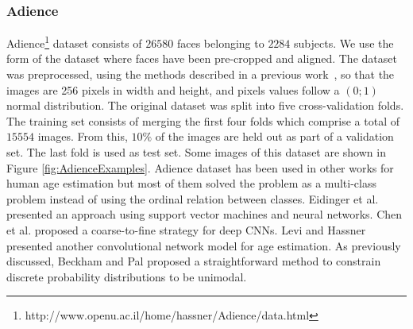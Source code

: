 \documentclass[journal]{IEEEtran}
\begin{document}
		
		
	\subsubsection{Adience}
	Adience\footnote{http://www.openu.ac.il/home/hassner/Adience/data.html} dataset consists of $26580$ faces belonging to $2284$ subjects. We use the form of the dataset where faces have been pre-cropped and aligned. The dataset was preprocessed, using the methods described in a previous work~\cite{beckham2017unimodal}, so that the images are 256 pixels in width and height, and pixels values follow a $(0;1)$ normal distribution. The original dataset was split into five cross-validation folds. The training set consists of merging the first four folds which comprise a total of $15554$ images. From this, $10\%$ of the images are held out as part of a validation set. The last fold is used as test set. Some images of this dataset are shown in Figure \ref{fig:AdienceExamples}. Adience dataset has been used in other works for human age estimation but most of them solved the problem as a multi-class problem instead of using the ordinal relation between classes. Eidinger et al. \cite{eidinger2014age} presented an approach using support vector machines and neural networks. Chen et al. \cite{chen2016cascaded} proposed a coarse-to-fine strategy for deep CNNs. Levi and Hassner \cite{levi2015age} presented another convolutional network model for age estimation. As previously discussed, Beckham and Pal \cite{beckham2017unimodal} proposed a straightforward method to constrain discrete probability distributions to be unimodal.
		
\end{document}
